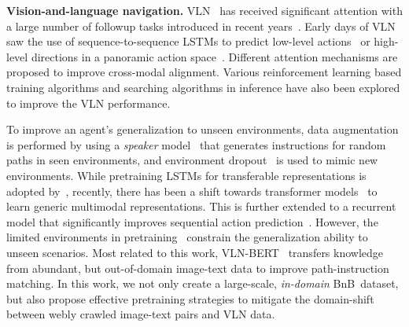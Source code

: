 \RequirePackage[dvipsnames,table]{xcolor} \documentclass[10pt,twocolumn,letterpaper]{article}
\newcommand{\p}[1]{\vspace{1mm}\noindent\textbf{#1}}
\newcommand{\vlnbert}{VLN-BERT}
\newcommand{\airbnb}{BnB}
\begin{document}
\p{Vision-and-language navigation.}
VLN~\cite{anderson2018r2r} has received significant attention with a large number of followup tasks introduced in recent years~\cite{anderson2018evaluation, chen2019touchdown, krantz2020r2rce, ku2020rxr, nguyen2019hanna, nguyen2019vlna, qi2020reverie, shridhar2020alfred, thomason2020cvdn}. 
Early days of VLN saw the use of sequence-to-sequence LSTMs to predict low-level actions~\cite{anderson2018r2r} or high-level directions in a panoramic action space~\cite{fried2018speaker}.
Different attention mechanisms \cite{ma2019self,qi2020object} are proposed to improve cross-modal alignment.
Various reinforcement learning based training algorithms \cite{tan2019envdrop,wang2020serl,wang2019reinforced,wang2018look} and searching algorithms in inference \cite{fried2018speaker,ma2019self,ma2019regretful} have also been explored to improve the VLN performance.


To improve an agent's generalization to unseen environments, data augmentation is performed by using a \emph{speaker} model~\cite{fried2018speaker} that generates instructions for random paths in seen environments, and environment dropout~\cite{tan2019envdrop} is used to mimic new environments.
While pretraining LSTMs for transferable representations is adopted by~\cite{huang2019transferable}, recently, there has been a shift towards transformer models~\cite{hao2020prevalent} to learn generic multimodal representations.
This is further extended to a recurrent model that significantly improves sequential action prediction~\cite{hong2021recurrentvln}.
However, the limited environments in pretraining~\cite{hao2020prevalent,huang2019transferable} constrain the generalization ability to unseen scenarios.
Most related to this work, \vlnbert~\cite{majumdar2020vlnbert} transfers knowledge from abundant, but out-of-domain image-text data to improve path-instruction matching.
In this work, we not only create a large-scale, \emph{in-domain} \airbnb~dataset, but also propose effective pretraining strategies to mitigate the domain-shift between webly crawled image-text pairs and VLN data.
\end{document}
